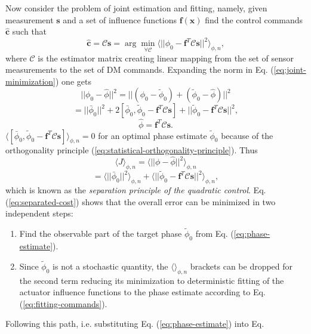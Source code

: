 Now consider the problem of joint estimation and fitting, namely, given
measurement $\bm{s}$ and a set of influence functions $\bm{f}(\bm{x})$ find the
control commands $\hat{\bm{c}}$ such that
\begin{equation} \label{eq:joint-minimization}
	\hat{\bm{c}} = \mathcal{C} \bm{s} =
	\arg \min_{\forall \mathcal{C}}
	\langle
	|| \phi_{0} - \bm{f}^{T} \mathcal{C} \bm{s} ||^{2}
	\rangle_{\phi,n},
\end{equation}
where $\mathcal{C}$ is the estimator matrix creating linear mapping from the
set of sensor measurements to the set of DM commands. Expanding the norm in Eq.
(\ref{eq:joint-minimization}) one gets
\begin{equation} \label{eq:cost-expansion}
  || \phi_{0} - \hat{\phi} ||^{2} =
  || (\phi_{0} - \tilde{\phi}_{0}) + (\tilde{\phi}_{0} - \hat{\phi}) ||^{2}
\end{equation}
$$
 = || \bar{\phi}_{0} ||^{2} +
   2 [\bar{\phi}_{0},
     \tilde{\phi}_{0} - \bm{f}^{T} \mathcal{C} \bm{s} ] +
   || \tilde{\phi}_{0} - \bm{f}^{T} \mathcal{C} \bm{s} ||^{2},
$$
$$
  \hat{\phi} = \bm{f}^{T} \mathcal{C} \bm{s}.
$$
$
\langle
[\bar{\phi}_{0}, \tilde{\phi}_{0} - \bm{f}^{T} \mathcal{C} \bm{s} ]
\rangle_{\phi,n} = 0
$
for an optimal phase estimate $\tilde{\phi}_{0}$ because of the orthogonality
principle (\ref{eq:statistical-orthogonality-principle}). Thus
\begin{equation} \label{eq:separated-cost}
	\langle J \rangle_{\phi,n} =
	\langle || \phi - \hat{\phi} ||^{2} \rangle_{\phi,n}
\end{equation}
$$
  = \langle || \bar{\phi}_{0} ||^{2} \rangle_{\phi,n} +
    \langle
    || \tilde{\phi}_{0} - \bm{f}^{T} \mathcal{C} \bm{s} ||^{2}
    \rangle_{\phi,n},
$$
which is known as the \emph{separation principle of the quadratic control}.
Eq. (\ref{eq:separated-cost}) shows that the overall error can be minimized
in two independent steps:
\begin{enumerate}
	\item Find the observable part of the target phase $\tilde{\phi}_{0}$ from Eq.
  (\ref{eq:phase-estimate}).
  \item Since $\tilde{\phi}_{0}$ is not a stochastic quantity, the $\langle
  \rangle_{\phi,n}$ brackets can be dropped for the second term reducing its
  minimization to deterministic fitting of the actuator influence
  functions to the phase estimate according to Eq. (\ref{eq:fitting-commands}).
\end{enumerate}
Following this path, i.e. substituting Eq. (\ref{eq:phase-estimate}) into Eq.
